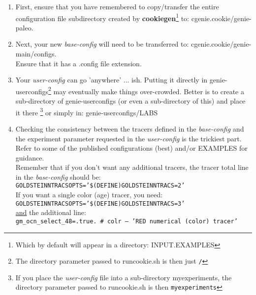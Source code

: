 \begin{enumerate}[noitemsep]
\vspace{1mm}
\item First, ensure that you have remembered to copy/transfer the entire configuration file subdirectory created by \textbf{cookiegen}\footnote{Which by default will appear in a directory: \textsf{\footnotesize INPUT.EXAMPLES}} to: \textsf{\footnotesize cgenie.cookie/genie-paleo}.
\vspace{1mm}
\item Next, your new \textit{base-config} will need to be transferred to: \textsf{\footnotesize cgenie.cookie/genie-main/configs}.
\\Ensure that it has a \textsf{\footnotesize .config} file extension.
\vspace{1mm}
\item Your \textit{user-config} can go 'anywhere' ... ish. Putting it directly in \textsf{\footnotesize genie-userconfigs}\footnote{The directory parameter passed to \textsf{\footnotesize runcookie.sh} is then just \texttt{/}} may eventually make things over-crowded. Better is to create a sub-directory of \textsf{\footnotesize genie-userconfigs} (or even a sub-directory of this) and place it there \footnote{If you place the \textit{user-config} file into a sub-directory  \textsf{\footnotesize myexperiments}, the directory parameter passed to \textsf{\footnotesize runcookie.sh} is then \texttt{myexperiments}} or simply in: \textsf{\footnotesize genie-userconfigs/LABS}
\vspace{1mm}
\item Checking the consistency between the tracers defined in the \textit{base-config} and the experiment parameter requested in the \textit{user-config} is the trickiest part. Refer to some of the published configurations (best) and/or EXAMPLES for guidance.
\vspace{1mm}
\\Remember that if you don't want any additional tracers, the tracer total line in the \textit{base-config} should be:
\\\texttt{\small GOLDSTEINNTRACSOPTS='\$(DEFINE)GOLDSTEINNTRACS=2'}
\vspace{1mm}
\\If you want a single color (age) tracer, you need:
\\\texttt{\small GOLDSTEINNTRACSOPTS='\$(DEFINE)GOLDSTEINNTRACS=3'}
\\\uline{and} the additional line:
\\\texttt{\small gm\_ocn\_select\_48=.true.     \#   colr -- 'RED numerical (color) tracer'} 

\end{enumerate}
